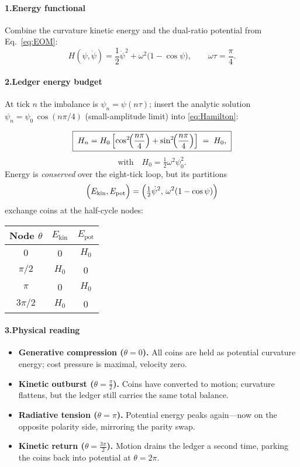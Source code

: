 \documentclass[11pt,oneside]{book}
\begin{document}
\paragraph*{1.\;Energy functional}

Combine the curvature kinetic energy and the dual-ratio potential from Eq.~\eqref{eq:EOM}:
\[
  H(\psi,\dot\psi)
  = \frac12\dot\psi^{2}
    + \omega^{2}\bigl(1-\cos\psi\bigr),
  \qquad
  \omega\tau=\frac{\pi}{4}.
\tag{10.3.1}\label{eq:Hamilton}
\]

\paragraph*{2.\;Ledger energy budget}

At tick $n$ the imbalance is $\psi_n = \psi( n\tau)$; insert the analytic solution
$\psi_n = \psi_{0}\,\cos(n\pi/4)$ (small-amplitude limit) into \eqref{eq:Hamilton}:

\[
\boxed{\;
  H_n
  = H_0\,
    \Bigl[
      \cos^{2}\!\Bigl(\frac{n\pi}{4}\Bigr)
      + \sin^{2}\!\Bigl(\frac{n\pi}{4}\Bigr)
    \Bigr]
  \;=\; H_0 ,
\;}
\]
\[
\text{with}\quad
H_0
= \tfrac12\omega^{2}\psi_{0}^{2}.
\]
Energy is \emph{conserved} over the eight-tick loop, but its partitions 
\[
  \Bigl(E_{\text{kin}},E_{\text{pot}}\Bigr)
  = \Bigl(\tfrac12\dot\psi^{2},\,\omega^{2}(1-\cos\psi)\Bigr)
\]
exchange coins at the half-cycle nodes:

\begin{center}
\begin{tabular}{c|c|c}
Node $\theta$ & $E_{\text{kin}}$ & $E_{\text{pot}}$ \\
\hline
$0$                 & 0                           & $H_0$   \\
$\pi/2$             & $H_0$                       & 0       \\
$\pi$               & 0                           & $H_0$   \\
$3\pi/2$            & $H_0$                       & 0       
\end{tabular}
\end{center}

\paragraph*{3.\;Physical reading}

\begin{itemize}
\item \textbf{Generative compression ($\theta=0$).}  
  All coins are held as potential curvature energy; cost pressure is maximal, velocity zero.
\item \textbf{Kinetic outburst ($\theta=\tfrac{\pi}{2}$).}  
  Coins have converted to motion; curvature flattens, but the ledger still carries the same total balance.
\item \textbf{Radiative tension ($\theta=\pi$).}  
  Potential energy peaks again—now on the opposite polarity side, mirroring the parity swap.
\item \textbf{Kinetic return ($\theta=\tfrac{3\pi}{2}$).}  
  Motion drains the ledger a second time, parking the coins back into potential at $\theta=2\pi$.
\end{itemize}
\end{document}
